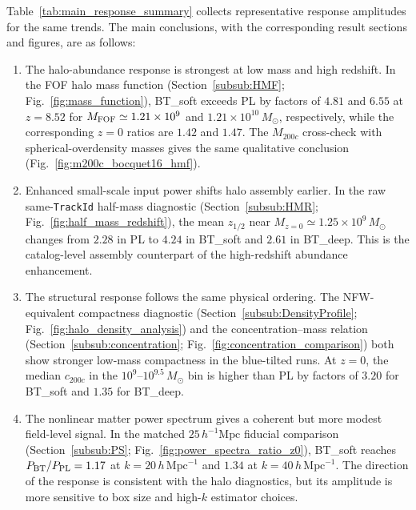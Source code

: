 \documentclass[
 reprint,
 superscriptaddress,
 nofootinbib,
 nobibnotes,
 amsmath,
 amssymb,
 aps,
 prd,
 floatfix,
 longbibliography
]{revtex4-2}
\begin{document}
Table~\ref{tab:main_response_summary} collects representative response amplitudes for the same trends. The main conclusions, with the corresponding result sections and figures, are as follows:
\begin{enumerate}
    \item The halo-abundance response is strongest at low mass and high redshift. In the FOF halo mass function (Section~\ref{subsub:HMF}; Fig.~\ref{fig:mass_function}), BT\_soft exceeds PL by factors of \(4.81\) and \(6.55\) at \(z=8.52\) for \(M_{\rm FOF}\simeq1.21\times10^9\) and \(1.21\times10^{10}\,M_\odot\), respectively, while the corresponding \(z=0\) ratios are \(1.42\) and \(1.47\). The \(M_{200c}\) cross-check with spherical-overdensity masses gives the same qualitative conclusion (Fig.~\ref{fig:m200c_bocquet16_hmf}).
    \item Enhanced small-scale input power shifts halo assembly earlier. In the raw same-\texttt{TrackId} half-mass diagnostic (Section~\ref{subsub:HMR}; Fig.~\ref{fig:half_mass_redshift}), the mean \(z_{1/2}\) near \(M_{z=0}\simeq1.25\times10^9\,M_\odot\) changes from \(2.28\) in PL to \(4.24\) in BT\_soft and \(2.61\) in BT\_deep. This is the catalog-level assembly counterpart of the high-redshift abundance enhancement.
    \item The structural response follows the same physical ordering. The NFW-equivalent compactness diagnostic (Section~\ref{subsub:DensityProfile}; Fig.~\ref{fig:halo_density_analysis}) and the concentration--mass relation (Section~\ref{subsub:concentration}; Fig.~\ref{fig:concentration_comparison}) both show stronger low-mass compactness in the blue-tilted runs. At \(z=0\), the median \(c_{200c}\) in the \(10^9\)--\(10^{9.5}\,M_\odot\) bin is higher than PL by factors of \(3.20\) for BT\_soft and \(1.35\) for BT\_deep.
    \item The nonlinear matter power spectrum gives a coherent but more modest field-level signal. In the matched \(25\,h^{-1}\mathrm{Mpc}\) fiducial comparison (Section~\ref{subsub:PS}; Fig.~\ref{fig:power_spectra_ratio_z0}), BT\_soft reaches \(P_{\rm BT}/P_{\rm PL}=1.17\) at \(k=20\,h\,\mathrm{Mpc}^{-1}\) and \(1.34\) at \(k=40\,h\,\mathrm{Mpc}^{-1}\). The direction of the response is consistent with the halo diagnostics, but its amplitude is more sensitive to box size and high-\(k\) estimator choices.
\end{enumerate}
\end{document}
